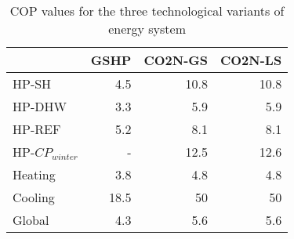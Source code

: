 \begin{table}[htp]
\centering
\caption{COP values for the three technological variants of energy system}\vspace{2mm}
\label{tab:V_cops} 
\begin{tabular}{lrrr}
	\toprule
	& GSHP & CO2N-GS & CO2N-LS \\ \midrule
	HP-SH            & 4.5  & 10.8    & 10.8    \\
	HP-DHW           & 3.3  & 5.9     & 5.9     \\
	HP-REF           & 5.2  & 8.1     & 8.1     \\
	HP-$CP_{winter}$ & -    & 12.5    & 12.6    \\
	Heating          & 3.8  & 4.8     & 4.8     \\
	Cooling          & 18.5 & 50      & 50      \\
	Global           & 4.3  & 5.6     & 5.6    \\ \bottomrule
\end{tabular}
\end{table}
